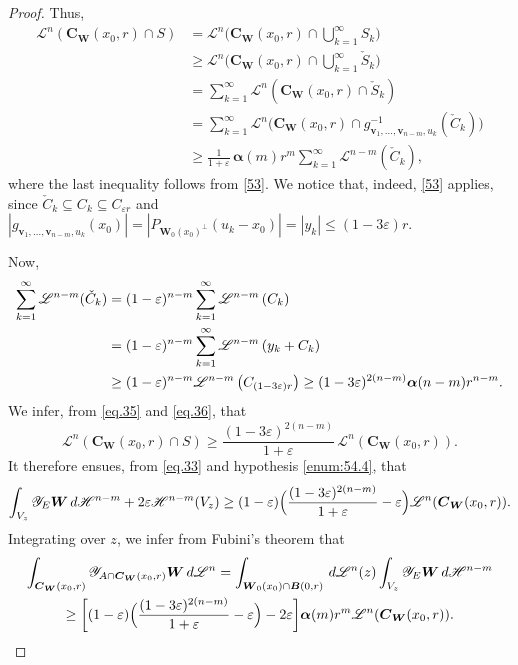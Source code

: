 \documentclass[11pt]{article}
\theoremstyle{definition}
\theoremstyle{jepanonymous}
\theoremstyle{plain}
\newcommand{\calH}{\mathscr{H}}
\newcommand{\calL}{\mathscr{L}}
\newcommand{\calY}{\mathscr{Y}}
\newcommand{\balpha}{\boldsymbol{\alpha}}
\newcommand{\bB}{{\boldsymbol{B}}}
\newcommand{\bC}{{\boldsymbol{C}}}
\newcommand{\bW}{{\boldsymbol{W}}}
\newcommand{\bv}{{\boldsymbol{v}}}
\let\veps\varepsilon
\let\subset\subseteq
\begin{document}
\begin{proof}
Thus,
\begin{equation}
\label{eq.35}
\begin{split}
\calL^n \left(\bC_\bW(x_0,r) \cap S\right) & =\calL^n \bigl(\bC_\bW(x_0,r) \cap \textstyle\bigcup_{k=1}^\infty S_k\bigr) \\
& \geq \calL^n \bigl(\bC_\bW(x_0,r) \cap \textstyle\bigcup_{k=1}^\infty \check{S}_k\bigr) \\
& = \sum_{k=1}^\infty \calL^n \left(\bC_\bW(x_0,r) \cap \check{S}_k\right) \\
& = \sum_{k=1}^\infty \calL^n \bigl(\bC_\bW(x_0,r) \cap g_{\bv_1,\ldots,\bv_{n-m},u_k}^{-1}(\check{C}_k) \bigr) \\
& \geq \frac{1}{1+\veps}\,\balpha(m)r^m \sum_{k=1}^\infty \calL^{n-m}(\check{C}_k),
\end{split}
\end{equation}
where the last inequality follows from \ref{53}.
We notice that, indeed, \ref{53} applies, since $\check{C}_k \subset C_k \subset C_{\veps r}$ and $\left|g_{\bv_1,\ldots,\bv_{n-m},u_k}(x_0)\right| = \left| P_{\bW_0(x_0)^\perp}(u_k-x_0) \right| = \left| y_k\right| \leq (1-3\veps)r$.
\par
Now,
\begin{align}
\sum_{k=1}^\infty \calL^{n-m} (\check{C}_k) &= (1-\veps)^{n-m} \sum_{k=1}^\infty \calL^{n-m} \left(C_k \right)\notag\\
&= (1-\veps)^{n-m} \sum_{k=1}^\infty \calL^{n-m} \left(y_k + C_k \right)\label{eq.36} \\
&\geq (1-\veps)^{n-m} \calL^{n-m} \left(C_{(1-3\veps)r} \right) \geq (1-3\veps)^{2(n-m)} \balpha(n-m)r^{n-m}.\notag
\end{align}
We infer, from \eqref{eq.35} and \eqref{eq.36}, that
\begin{equation*}
\calL^n \left(\bC_\bW(x_0,r) \cap S\right) \geq \frac{(1-3\veps)^{2(n-m)}}{1+\veps}\,\calL^n (\bC_\bW(x_0,r)).
\end{equation*}
It therefore ensues, from \eqref{eq.33} and hypothesis \eqref{enum:54.4}, that
\begin{equation*}
\int_{V_z} \calY_E \bW \,d\calH^{n-m} +2\veps \calH^{n-m}(V_z) \geq (1-\veps)\Bigl(\frac{(1-3\veps)^{2(n-m)}}{1+\veps} - \veps \Bigr)\calL^n(\bC_\bW(x_0,r)).
\end{equation*}
Integrating over $z$, we infer from Fubini's theorem that
\begin{multline*}
\int_{\bC_\bW(x_0,r)} \calY_{A \cap \bC_\bW(x_0,r)} \bW \,d\calL^n = \int_{\bW_0(x_0) \cap \bB(0,r)} \,d\calL^n(z) \int_{V_z} \calY_E \bW \,d\calH^{n-m} \\
\geq \biggl[ (1-\veps)\Bigl(\frac{(1-3\veps)^{2(n-m)}}{1+\veps}-\veps\Bigr)-2\veps\biggr]\balpha(m)r^m\calL^n(\bC_\bW(x_0,r)).\qedhere
\end{multline*}
\end{proof}
\end{document}
